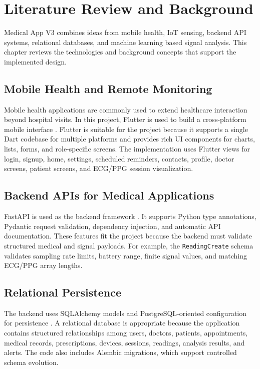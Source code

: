 \chapter{Literature Review and Background}

Medical App V3 combines ideas from mobile health, IoT sensing, backend API systems, relational databases, and machine learning based signal analysis. This chapter reviews the technologies and background concepts that support the implemented design.

\section{Mobile Health and Remote Monitoring}

Mobile health applications are commonly used to extend healthcare interaction beyond hospital visits. In this project, Flutter is used to build a cross-platform mobile interface \cite{flutter}. Flutter is suitable for the project because it supports a single Dart codebase for multiple platforms and provides rich UI components for charts, lists, forms, and role-specific screens. The implementation uses Flutter views for login, signup, home, settings, scheduled reminders, contacts, profile, doctor screens, patient screens, and ECG/PPG session visualization.

\section{Backend APIs for Medical Applications}

FastAPI is used as the backend framework \cite{fastapi}. It supports Python type annotations, Pydantic request validation, dependency injection, and automatic API documentation. These features fit the project because the backend must validate structured medical and signal payloads. For example, the \texttt{ReadingCreate} schema validates sampling rate limits, battery range, finite signal values, and matching ECG/PPG array lengths.

\section{Relational Persistence}

The backend uses SQLAlchemy models and PostgreSQL-oriented configuration for persistence \cite{sqlalchemy,postgresql}. A relational database is appropriate because the application contains structured relationships among users, doctors, patients, appointments, medical records, prescriptions, devices, sessions, readings, analysis results, and alerts. The code also includes Alembic migrations, which support controlled schema evolution.

